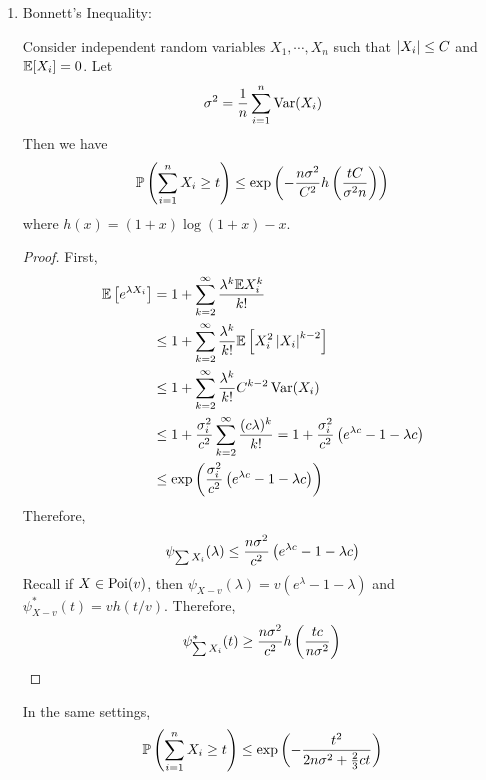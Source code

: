 \begin{enumerate}[label=\arabic{*}.]
	\item Bonnett's Inequality:
	\begin{lem}
	    Consider independent random variables $X_1,\cdots,X_n$ such that $\left\lvert X_i\right\lvert \leq C$ and $\mathbb{E}[X_i] = 0$. Let
	    \begin{equation*}
	    	\sigma^2 = \frac{1}{n}\sum_{i=1}^n\operatorname{Var}(X_i)
	    \end{equation*}
	    Then we have
	    \begin{equation*}
	    	\mathbb{P}\left(\sum_{i=1}^nX_i \geq t\right) \leq \exp\left(-\frac{n\sigma^2}{C^2}h\left(\frac{tC}{\sigma^2n}\right)\right)
	    \end{equation*}
	    where $h(x) = (1+x)\log(1+x)-x$.
	\end{lem}
	\begin{proof}
	    First,
	    \begin{equation*}
	    	\begin{aligned}
	    		\mathbb{E}\left[e^{\lambda X_i}\right] &= 1+\sum_{k=2}^\infty \frac{\lambda^k\mathbb{E} X_i^k}{k!} \\
	    		&\leq 1+\sum_{k=2}^\infty \frac{\lambda^k}{k!}\mathbb{E}\left[X_i^2\left\lvert X_i\right\lvert^{k-2}\right] \\
	    		&\leq 1+\sum_{k=2}^\infty \frac{\lambda^k}{k!}C^{k-2}\operatorname{Var}(X_i) \\
	    		&\leq 1+\frac{\sigma_i^2}{c^2}\sum_{k=2}^\infty \frac{(c\lambda)^k}{k!} = 1+\frac{\sigma_i^2}{c^2}\left(e^{\lambda c} - 1 -\lambda c\right) \\
	    		&\leq \exp\left(\frac{\sigma_i^2}{c^2}\left(e^{\lambda c} - 1 -\lambda c\right) \right)
	    	\end{aligned}
	    \end{equation*}
	    Therefore,
	    \begin{equation*}
	    	\psi_{\sum X_i}(\lambda) \leq \frac{n\sigma^2}{c^2}\left(e^{\lambda c} - 1 -\lambda c\right)
	    \end{equation*}
	    Recall if $X \in \operatorname{Poi}(v)$, then $\psi_{X-v}(\lambda) = v (e^\lambda-1 - \lambda)$ and $\psi^*_{X-v}(t) = vh(t/v)$. Therefore,
	    \begin{equation*}
	    	\psi^*_{\sum X_i}(t) \geq \frac{n\sigma^2}{c^2} h\left(\frac{tc}{n\sigma^2}\right) \qedhere
	    \end{equation*}
	\end{proof}
	\begin{cor}
	    In the same settings,
	    \begin{equation*}
	    	\mathbb{P}\left(\sum_{i=1}^nX_i \geq t\right) \leq \exp\left(-\frac{t^2}{2n\sigma^2+\frac{2}{3}ct}\right)
	    \end{equation*}

\end{cor}
\end{enumerate}

